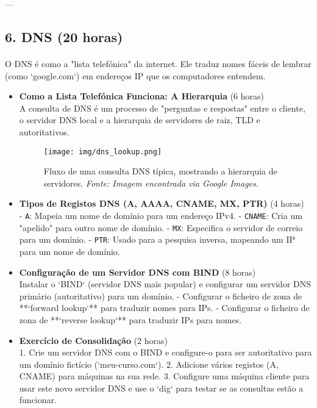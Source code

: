 \documentclass[10pt,a4paper]{article}
\begin{document}
	---
	
	\subsection*{6. DNS (20 horas)}
	\vspace{-1.2em}
	\paragraph{}
	O DNS é como a "lista telefónica" da internet. Ele traduz nomes fáceis de lembrar (como `google.com`) em endereços IP que os computadores entendem.
	
	\begin{itemize}
		\item \textbf{Como a Lista Telefónica Funciona: A Hierarquia} (6 horas) \\
		A consulta de DNS é um processo de "perguntas e respostas" entre o cliente, o servidor DNS local e a hierarquia de servidores de raiz, TLD e autoritativos.
		
		\begin{figure}[h]
			\centering
			\texttt{[image: img/dns\_lookup.png]}
			\caption{Fluxo de uma consulta DNS típica, mostrando a hierarquia de servidores. \textit{Fonte: Imagem encontrada via Google Images.}}
			\label{fig:dns_lookup}
		\end{figure}
		
		\item \textbf{Tipos de Registos DNS (A, AAAA, CNAME, MX, PTR)} (4 horas) \\
		- \texttt{A}: Mapeia um nome de domínio para um endereço IPv4.
		- \texttt{CNAME}: Cria um "apelido" para outro nome de domínio.
		- \texttt{MX}: Especifica o servidor de correio para um domínio.
		- \texttt{PTR}: Usado para a pesquisa inversa, mapeando um IP para um nome de domínio.
		
		\item \textbf{Configuração de um Servidor DNS com BIND} (8 horas) \\
		Instalar o `BIND` (servidor DNS mais popular) e configurar um servidor DNS primário (autoritativo) para um domínio.
		- Configurar o ficheiro de zona de **`forward lookup`** para traduzir nomes para IPs.
		- Configurar o ficheiro de zona de **`reverse lookup`** para traduzir IPs para nomes.
		
		\item \textbf{Exercício de Consolidação} (2 horas) \\
		1. Crie um servidor DNS com o BIND e configure-o para ser autoritativo para um domínio fictício (`meu-curso.com`).
		2. Adicione vários registos (A, CNAME) para máquinas na sua rede.
		3. Configure uma máquina cliente para usar este novo servidor DNS e use o `dig` para testar se as consultas estão a funcionar.
	\end{itemize}
	
\end{document}
